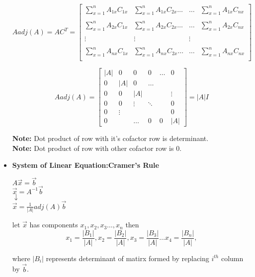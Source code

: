 \documentclass[a4paper,11pt]{article}
\numberwithin{equation}{section}
\begin{document}
\begin{itemize}
\begin{center}
    \[
   Aadj(A)= AC^T=
    \begin{bmatrix}
        \sum_{x=1}^{n}A_{1x}C_{1x}&\sum_{x=1}^{n}A_{1x}C_{2x}\dots&\dots&\sum_{x=1}^{n}A_{1x}C_{nx}\\
        &&&\\
        \sum_{x=1}^{n}A_{2x}C_{1x}&\sum_{x=1}^{n}A_{2x}C_{2x}\dots&\dots&\sum_{x=1}^{n}A_{2x}C_{nx}\\
        &&&\\
        \vdots&\vdots&\vdots&\\
        &&&\\
        \sum_{x=1}^{n}A_{nx}C_{1x}&\sum_{x=1}^{n}A_{nx}C_{2x}\dots&\dots&\sum_{x=1}^{n}A_{nx}C_{nx}\\
    \end{bmatrix}
    \]

    \[Aadj(A)=
    \begin{bmatrix}
        \vert A\vert&0&0&0&\dots&0\\
        0&\vert A\vert&0&\dots&\\
        0&0&\vert A\vert&&&\vdots\\
        0&0&\vdots&\ddots&&0\\
        0&\vdots&&&&0\\
        0&&\dots&0&0&\vert A\vert
    \end{bmatrix}=\vert A\vert I
    \]
\end{center}
\textbf{Note: }Dot product of row with it's cofactor row is determinant.\\
\textbf{Note: }Dot product of row with other cofactor row is 0.

\item \textbf{System of Linear Equation:Cramer's Rule }
\begin{center}
    $A\vec{x}=\vec{b}$\\
    $\vec{x}=A^{-1}\vec{b}$\\
    $\downarrow$\\
    $\vec{x}=\frac{1}{\vert A\vert}adj(A)\vec{b}$
\end{center}
let $\vec{x}$ has components $x_1,x_2,x_3\dots,x_n$ then \\
\begin{equation}
    x_1=\frac{\vert B_1\vert}{\vert A\vert},
    x_2=\frac{\vert B_2\vert}{\vert A\vert},
    x_3=\frac{\vert B_3\vert}{\vert A\vert}\dots
    x_4=\frac{\vert B_n\vert}{\vert A\vert},
\end{equation}

where $\vert B_i\vert$ represents determinant of matirx formed by replacing $i^{th}$ column by $\vec{b}$.


\end{itemize}
\end{document}
